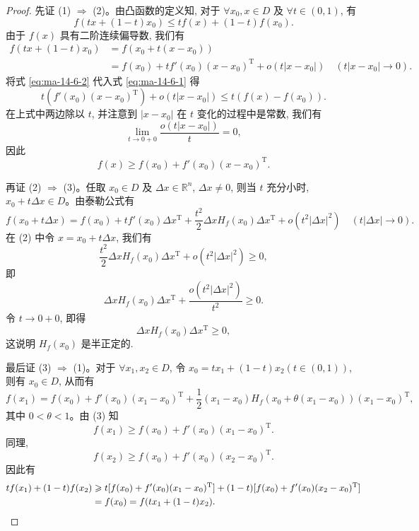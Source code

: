 \begin{proof}
先证 (1) $\Rightarrow$ (2)。由凸函数的定义知, 对于 $\forall x_0,x\in D$ 及 $\forall t\in(0,1)$, 有
\begin{equation}
  f(tx+(1-t)x_0)\leqslant tf(x)+(1-t)f(x_0).
  \label{eq:ma-14-6-1}
\end{equation}
由于 $f(x)$ 具有二阶连续偏导数, 我们有
\begin{equation}
  \begin{aligned}
    f(tx+(1-t)x_0)
    &=f(x_0+t(x-x_0))\\
    &=f(x_0)+tf'(x_0)(x-x_0)^{\mathrm T}
      +o(t|x-x_0|)\quad (t|x-x_0|\to0).
  \end{aligned}
  \label{eq:ma-14-6-2}
\end{equation}
将式 \eqref{eq:ma-14-6-2} 代入式 \eqref{eq:ma-14-6-1} 得
\[
  t(f'(x_0)(x-x_0)^{\mathrm T})+o(t|x-x_0|)\leqslant t(f(x)-f(x_0)).
\]
在上式中两边除以 $t$, 并注意到 $|x-x_0|$ 在 $t$ 变化的过程中是常数, 我们有
\[
  \lim_{t\to0+0}\frac{o(t|x-x_0|)}{t}=0,
\]
因此
\[
  f(x)\geqslant f(x_0)+f'(x_0)(x-x_0)^{\mathrm T}.
\]

再证 (2) $\Rightarrow$ (3)。任取 $x_0\in D$ 及 $\Delta x\in\mathbb R^n$, $\Delta x\ne0$, 则当 $t$ 充分小时, $x_0+t\Delta x\in D$。由泰勒公式有
\[
  f(x_0+t\Delta x)=f(x_0)+tf'(x_0)\Delta x^{\mathrm T}
  +\frac{t^2}{2}\Delta xH_f(x_0)\Delta x^{\mathrm T}
  +o(t^2|\Delta x|^2)\quad (t|\Delta x|\to0).
\]
在 (2) 中令 $x=x_0+t\Delta x$, 我们有
\[
  \frac{t^2}{2}\Delta xH_f(x_0)\Delta x^{\mathrm T}
  +o(t^2|\Delta x|^2)\geqslant0,
\]
即
\[
  \Delta xH_f(x_0)\Delta x^{\mathrm T}
  +\frac{o(t^2|\Delta x|^2)}{t^2}\geqslant0.
\]
令 $t\to0+0$, 即得
\[
  \Delta xH_f(x_0)\Delta x^{\mathrm T}\geqslant0,
\]
这说明 $H_f(x_0)$ 是半正定的.

最后证 (3) $\Rightarrow$ (1)。对于 $\forall x_1,x_2\in D$, 令 $x_0=tx_1+(1-t)x_2(t\in(0,1))$, 则有 $x_0\in D$, 从而有
\[
  f(x_1)=f(x_0)+f'(x_0)(x_1-x_0)^{\mathrm T}
  +\frac12(x_1-x_0)H_f(x_0+\theta(x_1-x_0))(x_1-x_0)^{\mathrm T},
\]
其中 $0<\theta<1$。由 (3) 知
\[
  f(x_1)\geqslant f(x_0)+f'(x_0)(x_1-x_0)^{\mathrm T}.
\]
同理,
\[
  f(x_2)\geqslant f(x_0)+f'(x_0)(x_2-x_0)^{\mathrm T}.
\]
因此有
\[
  \begin{aligned}
    tf(x_1)+(1-t)f(x_2)
    &\geqslant t[f(x_0)+f'(x_0)(x_1-x_0)^{\mathrm T}]
      +(1-t)[f(x_0)+f'(x_0)(x_2-x_0)^{\mathrm T}]\\
    &=f(x_0)=f(tx_1+(1-t)x_2).
  \end{aligned}
\qedhere
\]
\end{proof}


